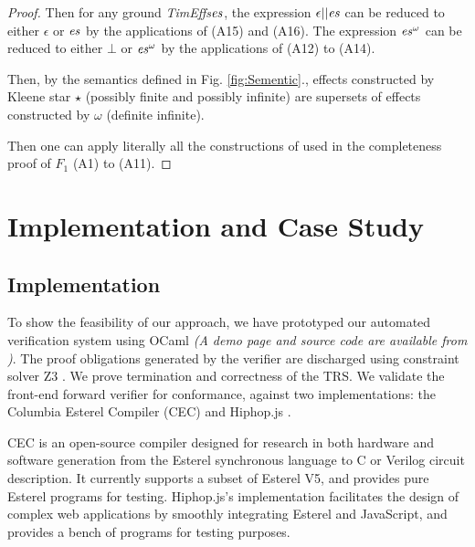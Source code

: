 \documentclass[acmsmall,10pt,review]{acmart}
\newcommand{\es}{\textcolor{black}{\ensuremath{{es}}}}
\newcommand{\timedEffects}{\emph{TimEffs}}
\newcommand{\code}[1]{{\tt{\ensuremath{\m{#1}}}}}
\newcommand{\m}{\mathit}
\newcommand\figref[1]{Fig. \textcolor{black}{\ref{#1}}.}
\begin{document}
{\begin{proof}
Then for any ground \timedEffects \code{\es}, the expression \code{\epsilon || \es} can be reduced to either \code{\epsilon} or \code{\es} by the applications of (A15) and (A16).  
The expression \code{\es^\omega} can be reduced to either \code{\bot} or \code{\es^\omega} by the applications of (A12) to (A14).  

Then, by the semantics defined in \figref{fig:Sementic}, effects constructed by Kleene star \code{\star} (possibly finite and possibly infinite) are supersets of effects constructed by \code{\omega} (definite infinite). 

Then one can apply literally all the constructions of \cite{salomaa1966two} used in the completeness proof of \code{F_1} (A1) to (A11).


\end{proof}




\section{Implementation and Case Study}
\label{sec:Evaluation}

\subsection{Implementation}
To show the feasibility of our approach, we have prototyped our automated verification system 
using OCaml \emph{(A demo page  and source code are available from \cite{CODE})}. 
The proof obligations generated by the verifier are discharged using constraint solver Z3 \citep{de2008z3}. 
We prove termination and correctness of the TRS. We validate the front-end forward verifier for conformance, against two implementations: the Columbia Esterel Compiler (CEC) 
\cite{CEC} and Hiphop.js \cite{HH_im}. 


CEC is an open-source compiler designed for research in both hardware and software generation from the Esterel synchronous language to C or Verilog circuit description. It currently supports a subset of Esterel V5, and provides pure Esterel programs for testing. Hiphop.js's implementation facilitates the design of complex web applications by smoothly integrating Esterel and JavaScript, and provides a bench of programs for testing purposes. 




}
\end{document}
